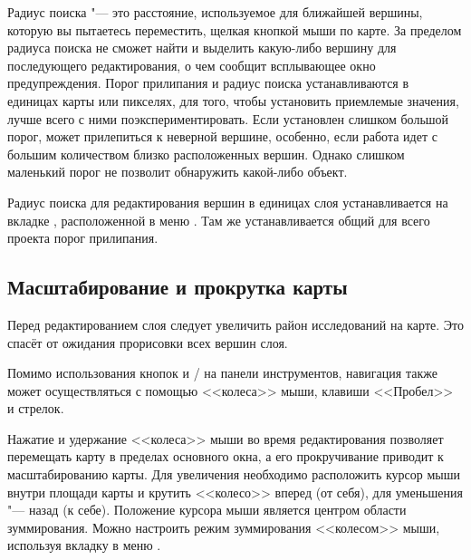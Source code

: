 
Радиус поиска "--- это расстояние, используемое \qg для 
ближайшей вершины, которую вы пытаетесь переместить, щелкая кнопкой мыши
по карте. За пределом радиуса поиска \qg не сможет найти и выделить
какую-либо вершину для последующего редактирования, о чем сообщит
всплывающее окно предупреждения. Порог прилипания и радиус поиска
устанавливаются в единицах карты или пикселях, для того, чтобы установить
приемлемые значения, лучше всего с ними поэкспериментировать. Если установлен
слишком большой порог, \qg может прилепиться к неверной вершине, особенно,
если работа идет с большим количеством близко расположенных вершин. Однако
слишком маленький порог не позволит обнаружить какой-либо объект.

Радиус поиска для редактирования вершин в единицах слоя устанавливается
на вкладке , расположенной в меню 
\arrow {}. Там же устанавливается
общий для всего проекта порог прилипания.

\subsection{Масштабирование и прокрутка карты}

Перед редактированием слоя следует увеличить район исследований на карте.
Это спасёт от ожидания прорисовки всех вершин слоя.

Помимо использования кнопок  и
/
на панели инструментов, навигация также может осуществляться с
помощью <<колеса>> мыши, клавиши <<Пробел>> и стрелок.


Нажатие и удержание <<колеса>> мыши во время редактирования позволяет перемещать
карту в пределах основного окна, а его прокручивание приводит к
масштабированию карты. Для увеличения необходимо расположить курсор мыши внутри
площади карты и крутить <<колесо>> вперед (от себя), для уменьшения "--- назад
(к себе). Положение курсора мыши является центром области зуммирования. Можно
настроить режим зуммирования <<колесом>> мыши, используя вкладку
 в меню  \arrow {}.


